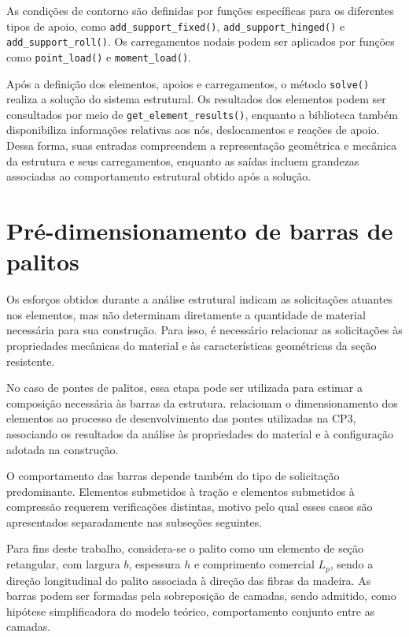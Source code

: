 As condições de contorno são definidas por funções específicas para os diferentes tipos de apoio, como \texttt{add\_support\_fixed()}, \texttt{add\_support\_hinged()} e \texttt{add\_support\_roll()}. Os carregamentos nodais podem ser aplicados por funções como \texttt{point\_load()} e \texttt{moment\_load()}.

Após a definição dos elementos, apoios e carregamentos, o método \texttt{solve()} realiza a solução do sistema estrutural. Os resultados dos elementos podem ser consultados por meio de \texttt{get\_element\_results()}, enquanto a biblioteca também disponibiliza informações relativas aos nós, deslocamentos e reações de apoio. Dessa forma, suas entradas compreendem a representação geométrica e mecânica da estrutura e seus carregamentos, enquanto as saídas incluem grandezas associadas ao comportamento estrutural obtido após a solução.

\section{Pré-dimensionamento de barras de palitos}
\label{sec:fund-pre-dimensionamento}

Os esforços obtidos durante a análise estrutural indicam as solicitações atuantes nos elementos, mas não determinam diretamente a quantidade de material necessária para sua construção. Para isso, é necessário relacionar as solicitações às propriedades mecânicas do material e às características geométricas da seção resistente.

No caso de pontes de palitos, essa etapa pode ser utilizada para estimar a composição necessária às barras da estrutura.  relacionam o dimensionamento dos elementos ao processo de desenvolvimento das pontes utilizadas na \gls{CP3}, associando os resultados da análise às propriedades do material e à configuração adotada na construção.

O comportamento das barras depende também do tipo de solicitação predominante. Elementos submetidos à tração e elementos submetidos à compressão requerem verificações distintas, motivo pelo qual esses casos são apresentados separadamente nas subseções seguintes.

Para fins deste trabalho, considera-se o palito como um elemento de seção retangular, com largura \(b\), espessura \(h\) e comprimento comercial \(L_p\), sendo a direção longitudinal do palito associada à direção das fibras da madeira. As barras podem ser formadas pela sobreposição de camadas, sendo admitido, como hipótese simplificadora do modelo teórico, comportamento conjunto entre as camadas.

